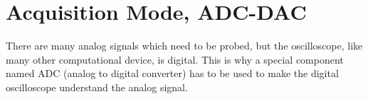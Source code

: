 \documentclass[a4paper, 12pt]{article}
\begin{document}
\begin{figure}[!h]
	\centering
	\hfill
	\caption{}
	\label{fig:trig-volt}
\end{figure}

\section{Acquisition Mode, ADC-DAC}

There are many analog signals which need to be probed, but the oscilloscope, like many other computational device, is digital.
This is why a special component named ADC (analog to digital converter) has to be used to make the digital oscilloscope understand the analog signal.

\begin{figure}
	\centering
	\hfill
	\hfill
	\caption{}
	\label{fig:acq-mode}
\end{figure}
\end{document}
